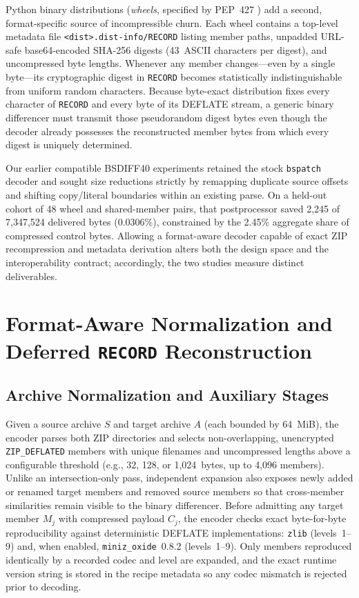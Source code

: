 \documentclass[10pt,letterpaper]{article}
\theoremstyle{remark}
\begin{document}
Python binary distributions (\emph{wheels}, specified by PEP~427 \cite{pep427}) add a second, format-specific source of incompressible churn. Each wheel contains a top-level metadata file \texttt{<dist>.dist-info/RECORD} listing member paths, unpadded URL-safe base64-encoded SHA-256 digests (43~ASCII characters per digest), and uncompressed byte lengths. Whenever any member changes---even by a single byte---its cryptographic digest in \texttt{RECORD} becomes statistically indistinguishable from uniform random characters. Because byte-exact distribution fixes every character of \texttt{RECORD} and every byte of its DEFLATE stream, a generic binary differencer must transmit those pseudorandom digest bytes even though the decoder already possesses the reconstructed member bytes from which every digest is uniquely determined.

Our earlier compatible BSDIFF40 experiments retained the stock \texttt{bspatch} decoder and sought size reductions strictly by remapping duplicate source offsets and shifting copy/literal boundaries within an existing parse. On a held-out cohort of 48 wheel and shared-member pairs, that postprocessor saved 2,245 of 7,347,524 delivered bytes (0.0306\%), constrained by the 2.45\% aggregate share of compressed control bytes. Allowing a format-aware decoder capable of exact ZIP recompression and metadata derivation alters both the design space and the interoperability contract; accordingly, the two studies measure distinct deliverables.

\section{Format-Aware Normalization and Deferred \texttt{RECORD} Reconstruction}
\label{sec:method}

\subsection{Archive Normalization and Auxiliary Stages}
\label{sec:stages}

Given a source archive $S$ and target archive $A$ (each bounded by 64~MiB), the encoder parses both ZIP directories and selects non-overlapping, unencrypted \texttt{ZIP\_DEFLATED} members with unique filenames and uncompressed lengths above a configurable threshold (e.g., 32, 128, or 1,024~bytes, up to 4,096 members). Unlike an intersection-only pass, independent expansion also exposes newly added or renamed target members and removed source members so that cross-member similarities remain visible to the binary differencer. Before admitting any target member $M_j$ with compressed payload $C_j$, the encoder checks exact byte-for-byte reproducibility against deterministic DEFLATE implementations: \texttt{zlib} \cite{zlib} (levels~1--9) and, when enabled, \texttt{miniz\_oxide}~0.8.2 \cite{minizoxide} (levels~1--9). Only members reproduced identically by a recorded codec and level are expanded, and the exact runtime version string is stored in the recipe metadata so any codec mismatch is rejected prior to decoding.
\end{document}
